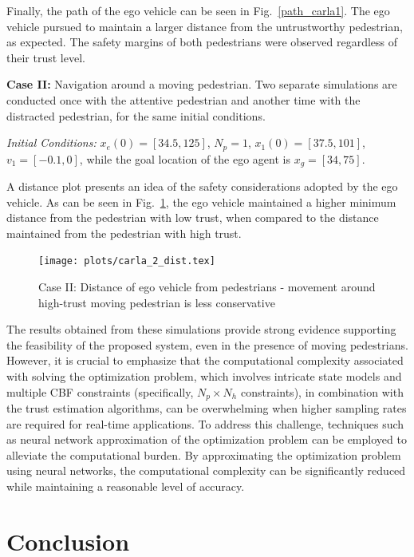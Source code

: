 \documentclass[journal]{IEEEtran}
\begin{document}
Finally, the path of the ego vehicle can be seen in Fig.~\ref{path_carla1}. The ego vehicle pursued to maintain a larger distance from the untrustworthy pedestrian, as expected. The safety margins of both pedestrians were observed regardless of their trust level.



\textbf{Case II:} Navigation around a moving pedestrian. Two separate simulations are conducted once with the attentive pedestrian and another time with the distracted pedestrian, for the same initial conditions.

\textit{Initial Conditions: } $x_e(0) = [34.5, 125]$, $N_p = 1$, $x_1(0) = [37.5, 101]$, $v_1 = [-0.1, 0]$, while the goal location of the ego agent is $x_g = [34, 75]$.

A distance plot presents an idea of the safety considerations adopted by the ego vehicle. As can be seen in Fig.~\ref{dist_carla2}, the ego vehicle maintained a higher minimum distance from the pedestrian with low trust, when compared to the distance maintained from the pedestrian with high trust.

\begin{figure}
  \centering
  \texttt{[image: plots/carla\_2\_dist.tex]}
  \caption{Case II: Distance of ego vehicle from pedestrians - movement around high-trust moving pedestrian is less conservative}
  \label{dist_carla2}
\end{figure}


The results obtained from these simulations provide strong evidence supporting the feasibility of the proposed system, even in the presence of moving pedestrians. However, it is crucial to emphasize that the computational complexity associated with solving the optimization problem, which involves intricate state models and multiple CBF constraints (specifically, $N_p \times N_h$ constraints), in combination with the trust estimation algorithms, can be overwhelming when higher sampling rates are required for real-time applications.
To address this challenge, techniques such as neural network approximation of the optimization problem can be employed to alleviate the computational burden. By approximating the optimization problem using neural networks, the computational complexity can be significantly reduced while maintaining a reasonable level of accuracy. 

\section{Conclusion}
\end{document}
